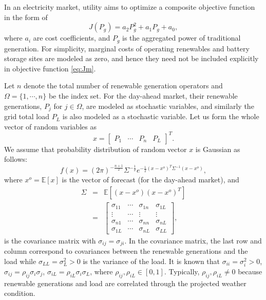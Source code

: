 \documentclass[journal]{IEEEtran}
\begin{document}
In an electricity market, utility aims to optimize a composite objective function in the form of 
\begin{equation} 
J(P_g) = a_2 P_g^2 + a_1 P_g + a_0, \label{eq:Jm}
\end{equation}
where $a_i$ are cost coefficients, and $P_g$ is the aggregated power of traditional generation. For simplicity, marginal costs of operating renewables and battery storage sites are modeled as zero, and hence they need not be included explicitly in objective function \eqref{eq:Jm}. 

Let $n$ denote the total number of renewable generation operators and $\Omega=\{1,\cdots,n\}$ be the index set. For the day-ahead market, their renewable generations, $P_j$ for $j\in\Omega$, are modeled as stochastic variables, and similarly the grid total load $P_L$ is also modeled as a stochastic variable. Let us form the whole vector of random variables as 
\begin{equation} 
x = \begin{bmatrix} P_1 & \cdots & P_n & P_L \end{bmatrix}^T.  \label{eq:x}
\end{equation}
We assume that probability distribution of random vector $x$ is Gaussian as follows:
\[ f(x) = (2\pi)^{-\frac{n+1}{2}}\Sigma^{-\frac{1}{2}} e^{-\frac{1}{2}(x-x^o)^T\Sigma^{-1}(x-x^o)},  \]
where  $x^o=\mathbb{E}[x]$ is the vector of forecast (for the day-ahead market), and 
\begin{eqnarray*}
\Sigma & = & \mathbb{E}[(x-x^o)(x-x^o)^T] \\
& = & \begin{bmatrix} \sigma_{11} & \cdots & \sigma_{1n} & \sigma_{1L} \\ \vdots & \cdots & \vdots & \vdots \\ \sigma_{n1} & \cdots & \sigma_{nn} & \sigma_{nL} \\ \sigma_{1L} & \cdots & \sigma_{nL} & \sigma_{LL}
\end{bmatrix},  
\end{eqnarray*}
is the covariance matrix with $\sigma_{ij}=\sigma_{ji}$. In the covariance matrix, the last row and column correspond to covariances between the renewable generations and the load while $\sigma_{LL}=\sigma_L^2>0$ is the variance of the load. It is known that
$\sigma_{ii}=\sigma_i^2>0$, $\sigma_{ij}=\rho_{ij}\sigma_i\sigma_j$, $\sigma_{iL}=\rho_{iL}\sigma_i\sigma_L$, where $\rho_{ij},\rho_{iL}\in[0,1]$. Typically, $\rho_{ij},\rho_{iL}\not=0$ because renewable generations and load are correlated through the projected weather condition.
\end{document}

